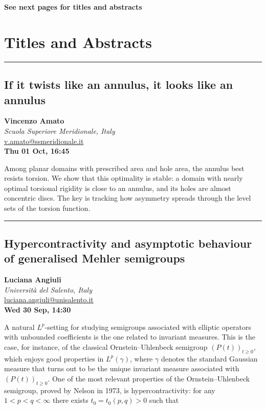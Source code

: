 \documentclass[a4paper,11pt]{article}
\begin{document}
\textbf{See next pages for titles and abstracts}

\newpage

\section*{\centering Titles and Abstracts}

\noindent\rule{\textwidth}{0.4pt}
\begin{center}
\subsection*{If it twists like an annulus, it looks like an annulus}

\textbf{Vincenzo Amato} \\
\textit{Scuola Superiore Meridionale, Italy} \\
\url{v.amato@ssmeridionale.it} \\
\textbf{Thu 01 Oct, 16:45}
\
\end{center}
\medskip
Among planar domains with prescribed area and hole area, the annulus best resists torsion. We show that this optimality is stable: a domain with nearly optimal torsional rigidity is close to an annulus, and its holes are almost concentric discs. The key is tracking how asymmetry spreads through the level sets of the torsion function.

\newpage

\noindent\rule{\textwidth}{0.4pt}

\begin{center}
\subsection*{Hypercontractivity and asymptotic behaviour of generalised Mehler semigroups}

\textbf{Luciana Angiuli} \\
\textit{Università del Salento, Italy} \\
\url{luciana.angiuli@unisalento.it} \\
\textbf{Wed 30 Sep, 14:30}
\
\end{center}
\medskip
A natural $L^p$-setting for studying semigroups associated with elliptic operators with unbounded coefficients is the one related to invariant measures. This is the case, for instance, of the classical Ornstein–Uhlenbeck semigroup $(P(t))_{t \ge 0}$, which enjoys good properties in $L^p(\gamma)$, where $\gamma$ denotes the standard Gaussian measure that turns out to be the unique invariant measure associated with $(P(t))_{t \ge 0}$. One of the most relevant properties of the Ornstein–Uhlenbeck semigroup, proved by Nelson in 1973, is hypercontractivity: for any $1<p<q<\infty$ there exists $t_0=t_0(p,q)>0$ such that
\end{document}
